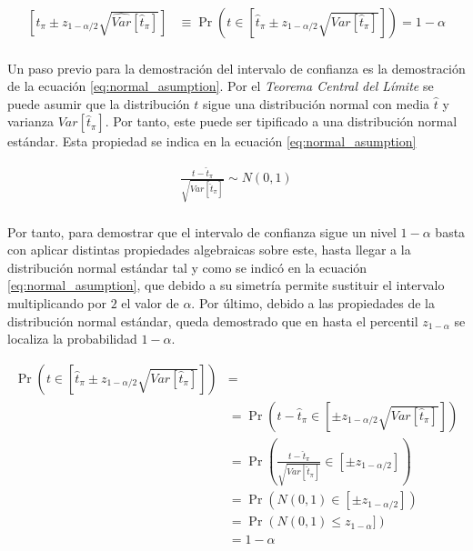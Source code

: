 \documentclass{article}
\begin{document}
    \begin{align}
    \label{eq:confidence_interval}
      \left[\widehat{t}_\pi \pm z_{1-\alpha/2}\sqrt{\widehat{Var}[\widehat{t}_\pi]}\right] &\equiv \Pr\left(t\in \left[\widehat{t}_\pi \pm z_{1-\alpha/2}\sqrt{Var[\widehat{t}_\pi]}\right]\right) = 1-\alpha
    \end{align}

    \paragraph{}
    Un paso previo para la demostración del intervalo de confianza es la demostración de la ecuación \eqref{eq:normal_asumption}. Por el \emph{Teorema Central del Límite} se puede asumir que la distribución $t$ sigue una distribución normal con media $\widehat{t}$ y varianza $Var[\widehat{t}_\pi]$. Por tanto, este puede ser tipificado a una distribución normal estándar. Esta propiedad se indica en la ecuación \eqref{eq:normal_asumption}

    \begin{align}
    \label{eq:normal_asumption}
      \frac{t - \widehat{t}_\pi}{\sqrt{Var[\widehat{t}_\pi]}} \sim N(0,1)
    \end{align}

    \paragraph{}
    Por tanto, para demostrar que el intervalo de confianza sigue un nivel $1-\alpha$ basta con aplicar distintas propiedades algebraicas sobre este, hasta llegar a la distribución normal estándar tal y como se indicó en la ecuación \eqref{eq:normal_asumption}, que debido a su simetría permite sustituir el intervalo multiplicando por $2$ el valor de $\alpha$. Por último, debido a las propiedades de la distribución normal estándar, queda demostrado que en hasta el percentil $z_{1-\alpha}$ se localiza la probabilidad $1-\alpha$.

    \begin{align}
      \Pr\left(t\in \left[\widehat{t}_\pi \pm z_{1-\alpha/2}\sqrt{Var[\widehat{t}_\pi]}\right]\right) &=\\
      &= \Pr\left(t - \widehat{t}_\pi \in \left[\pm z_{1-\alpha/2}\sqrt{Var[\widehat{t}_\pi]}\right]\right) \\
      &= \Pr\left(\frac{t - \widehat{t}_\pi}{\sqrt{Var[\widehat{t}_\pi]}} \in \left[\pm z_{1-\alpha/2}\right]\right)  \\
      &= \Pr\left(N(0,1) \in [\pm z_{1-\alpha/2}]\right) \\
      &= \Pr\left(N(0,1) \leq z_{1-\alpha}]\right) \\
      &=  1- \alpha
    \end{align}
	\nocite{muest2017}
  \nocite{sarndal2003model}

  
  
\end{document}
